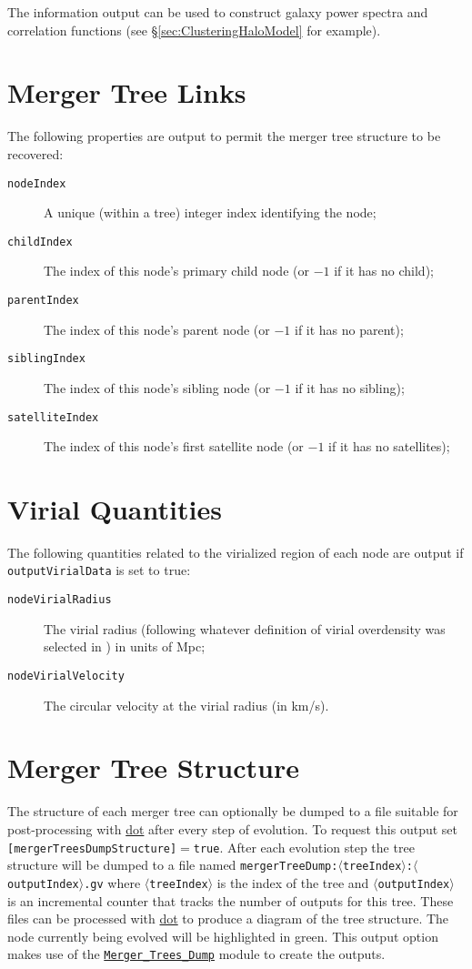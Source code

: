 The information output can be used to construct galaxy power spectra and correlation functions (see \S\ref{sec:ClusteringHaloModel} for example).

\section{Merger Tree Links}

The following properties are output to permit the merger tree structure to be recovered:
\begin{description}
 \item [{\tt nodeIndex}] A unique (within a tree) integer index identifying the node;
 \item [{\tt childIndex}] The index of this node's primary child node (or $-1$ if it has no child);
 \item [{\tt parentIndex}] The index of this node's parent node (or $-1$ if it has no parent);
 \item [{\tt siblingIndex}] The index of this node's sibling node (or $-1$ if it has no sibling);
 \item [{\tt satelliteIndex}] The index of this node's first satellite node (or $-1$ if it has no satellites);
\end{description}

\section{Virial Quantities}

The following quantities related to the virialized region of each node are output if {\tt outputVirialData} is set to true:
\begin{description}
 \item [{\tt nodeVirialRadius}] The virial radius (following whatever definition of virial overdensity was selected in \glc) in units of Mpc;
 \item [{\tt nodeVirialVelocity}] The circular velocity at the virial radius (in km/s).
\end{description}

\section{Merger Tree Structure}

The structure of each merger tree can optionally be dumped to a file suitable for post-processing with \href{http://www.graphviz.org/}{\sc dot} after every step of evolution. To request this output set {\tt [mergerTreesDumpStructure]}$=${\tt true}. After each evolution step the tree structure will be dumped to a file named {\tt mergerTreeDump:$\langle$treeIndex$\rangle$:$\langle$outputIndex$\rangle$.gv} where $\langle${\tt treeIndex}$\rangle$ is the index of the tree and $\langle${\tt outputIndex}$\rangle$ is an incremental counter that tracks the number of outputs for this tree. These files can be processed with \href{http://www.graphviz.org/}{\sc dot} to produce a diagram of the tree structure. The node currently being evolved will be highlighted in green. This output option makes use of the \hyperlink{objects.merger_trees.dump.F90:merger_trees_dump}{\tt Merger\_Trees\_Dump} module to create the outputs.
